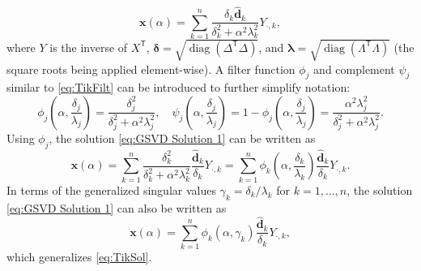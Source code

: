 \documentclass[12pt]{article}
\newcommand{\dVec}{\mathbf{d}}	%
\newcommand{\xVec}{\mathbf{x}}	%
\newcommand{\trans}[1]{{#1}^\mathsf{T}}	%
\DeclareMathOperator{\diag}{diag}	%
\newcommand{\regparam}{\alpha}
\newcommand{\filt}{\phi}
\newcommand{\mfilt}{\psi}
\newcommand{\svd}[1]{\widehat{#1}}	%
\begin{document}
\begin{equation}
\label{eq:GSVD Solution 1}
\xVec(\regparam) = \sum_{k = 1}^{n} \frac{\delta_k \svd{\dVec}_k}{\delta^2_k + \regparam^2 \lambda^2_k}Y_{\cdot,k},
\end{equation}
where $Y$ is the inverse of $\trans{X}$, $\bm{\delta} = \sqrt{\diag(\trans{\Delta}\Delta)}$, and $\bm{\lambda} = \sqrt{\diag(\trans{\Lambda}\Lambda)}$ (the square roots being applied element-wise).  A filter function $\filt_j$ and complement $\mfilt_j$ similar to \eqref{eq:TikFilt} can be introduced to further simplify notation:
\begin{equation}
\label{eq:Filter functions}
\filt_j\left(\regparam,\frac{\delta_j}{\lambda_j}\right) = \frac{\delta^2_j}{\delta^2_j + \regparam^2 \lambda^2_j}, \quad \mfilt_j\left(\regparam,\frac{\delta_j}{\lambda_j}\right) = 1 - \filt_j\left(\regparam,\frac{\delta_j}{\lambda_j}\right) = \frac{\regparam^2 \lambda^2_j}{\delta^2_j + \regparam^2 \lambda^2_j}.
\end{equation}
Using $\filt_j$, the solution \eqref{eq:GSVD Solution 1} can be written as
\begin{equation}
\label{eq:GSVD Solution 2}
\xVec(\regparam) = \sum_{k = 1}^{n} \frac{\delta^2_k}{\delta^2_k + \regparam^2 \lambda^2_k} \frac{\svd{\dVec}_k}{\delta_k} Y_{\cdot,k} = \sum_{k = 1}^{n} \filt_k\left(\regparam,\frac{\delta_k}{\lambda_k}\right) \frac{\svd{\dVec}_k}{\delta_k} Y_{\cdot,k}.
\end{equation} 
In terms of the generalized singular values $\gamma_k = \delta_k/\lambda_k$ for $k = 1,\ldots,n$, the solution \eqref{eq:GSVD Solution 1} can also be written as
\begin{equation}
\label{eq:GSVD Solution 3}
\xVec(\regparam) = \sum_{k = 1}^{n} \filt_k\left(\regparam,\gamma_k\right) \frac{\svd{\dVec}_k}{\delta_k} Y_{\cdot,k},
\end{equation}
which generalizes \eqref{eq:TikSol}.
\end{document}
